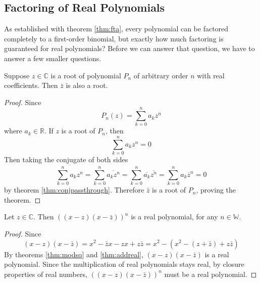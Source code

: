 \documentclass[11pt]{article}
\numberwithin{lemma}{section}
\numberwithin{equation}{section}
\numberwithin{define}{section}
\numberwithin{prop}{section}
\numberwithin{figure}{section}
\numberwithin{theorem}{section}
\numberwithin{cor}{section}
\newcounter{ex}[section]
\numberwithin{ex}{section}
\def\real{\mathbb{R}}
\def\complex{\mathbb{C}}
\begin{document}
\subsection{Factoring of Real Polynomials}
As established with theorem \eqref{thm:fta}, every polynomial can be factored completely to a first-order binomial, but exactly how much factoring is guaranteed for real polynomials? Before we can answer that question, we have to answer a few smaller questions.

\begin{theorem}
\label{thm:conjpair}
Suppose $z\in\complex$ is a root of polynomial $P_n$ of arbitrary order $n$ with real coefficients. Then $\bar{z}$ is also a root.\footnotemark	
\end{theorem}
\begin{proof}
	Since
	$$P_n(z)=\sum^n_{k=0}a_kz^n$$
	where $a_k\in\real$. If $z$ is a root of $P_n$, then
	$$\sum^n_{k=0}a_kz^n=0$$
	Then taking the conjugate of both sides
	$$\overline{\sum^n_{k=0}a_kz^n}=
	\sum^n_{k=0}\overline{a_kz^n}=
	\sum^n_{k=0}\overline{a_k}\overline{z^n}=
	\sum^n_{k=0}a_k\overline{z}^n=0$$
	by theorem \eqref{thm:conjpassthrough}. Therefore $\bar{z}$ is a root of $P_n$, proving the theorem.
\end{proof}

\begin{lemma}
\label{lem:realpoly}
Let $z\in\complex$. Then $((x-z)(x-\bar z))^n$ is a real polynomial, for any $n\in\mathbb{W}$.
\end{lemma}
\begin{proof}
	Since
	$$(x-z)(x-\bar z)=x^2-\bar z x -zx+z\bar z=x^2-(x^2-(z+\bar z)+z\bar z)$$
	By theorems \eqref{thm:modsq} and \eqref{thm:addreal},
	$(x-z)(x-\bar z)$ is a real polynomial. 
	Since the multiplication of real polynomials stays real, by closure properties of real numbers, $((x-z)(x-\bar z))^n$ must be a real polynomial.
\end{proof}
\end{document}

